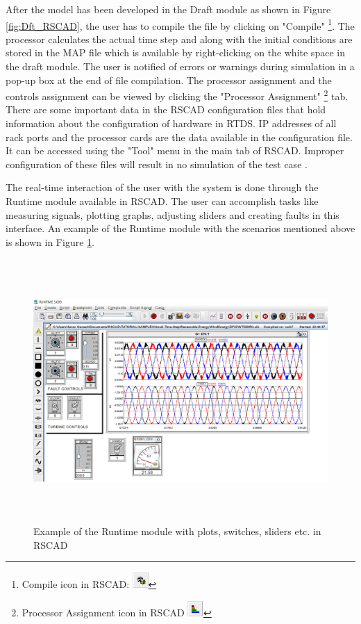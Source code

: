 After the model has been developed in the Draft module as shown in Figure \ref{fig:Dft_RSCAD}, the user has to compile the file by clicking on "Compile" \footnote{Compile icon in RSCAD: \includegraphics[width=0.6cm, height=0.6cm]{Diagrams/Chapter_3/Compile_pic.PNG}}. The processor calculates the actual time step and along with the initial conditions are stored in the MAP file which is available by right-clicking on the white space in the draft module. The user is notified of errors or warnings during simulation in a pop-up box at the end of file compilation. The processor assignment and the controls assignment can be viewed by clicking the "Processor Assignment" \footnote{Processor Assignment icon in RSCAD \includegraphics[width=0.6cm, height=0.6cm]{Diagrams/Chapter_3/Processor_assignment_pic.PNG}} tab. There are some important data in the RSCAD configuration files that hold information about the configuration of hardware in RTDS. IP addresses of all rack ports and the processor cards are the data available in the configuration file. It can be accessed using the "Tool" menu in the main tab of RSCAD. Improper configuration of these files will result in no simulation of the test case \cite{rtds_tech}. 

The real-time interaction of the user with the system is done through the Runtime module available in RSCAD. The user can accomplish tasks like measuring signals, plotting graphs, adjusting sliders and creating faults in this interface. An example of the Runtime module with the scenarios mentioned above is shown in Figure \ref{fig:Runtime_RSCAD}.

\begin{figure}[H]
\centering
    \includegraphics[height = 10cm,width = 15.5cm]{Diagrams/Chapter_3/Runtime_pic.PNG}
    \caption{Example of the Runtime module with plots, switches, sliders etc. in RSCAD}
    \label{fig:Runtime_RSCAD}
\end{figure}



